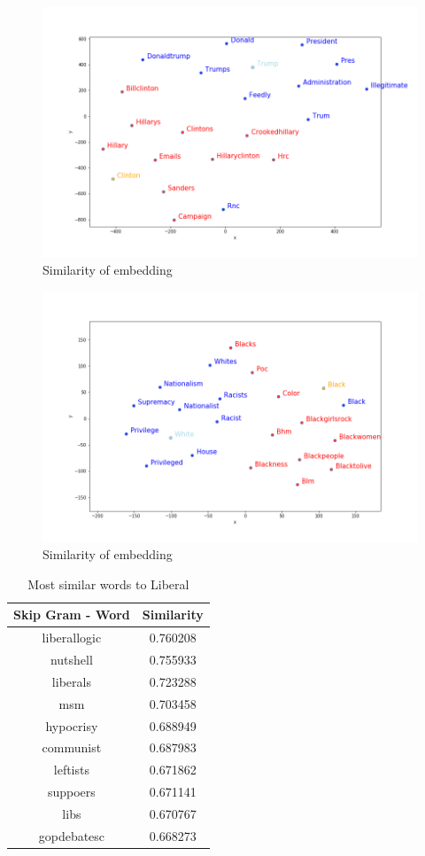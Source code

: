 \documentclass[12pt, authoryear]{elsarticle}
\begin{document}
\begin{figure}[H]
\includegraphics[width=6in]{embedding_clinton_trump}
\centering
\caption{Similarity of embedding}
\label{embedding:2}
\end{figure}

\begin{figure}[H]
\includegraphics[width=6in]{embedding_black_white}
\centering
\caption{Similarity of embedding}
\label{embedding:3}
\end{figure}

\begin{center}
\begin{table}[H]
\begin{tabular}{ c c }
Skip Gram - Word   &  Similarity \\
 \hline
liberallogic   &  0.760208 \\
nutshell   &  0.755933 \\
liberals   &  0.723288\\
msm   &  0.703458\\
hypocrisy  &   0.688949\\
communist  &   0.687983\\
leftists  &   0.671862\\
suppoers    & 0.671141\\
libs   &  0.670767\\
gopdebatesc   &  0.668273\\
 \hline
\end{tabular}
\caption{Most similar words to Liberal}
\label{table:7}
\end{table}
\end{center}
\end{document}
